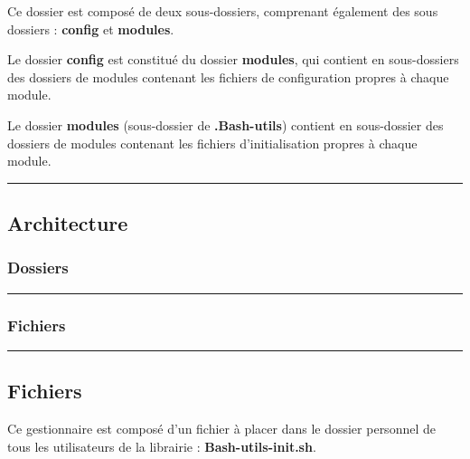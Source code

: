 \documentclass[a4paper,10pt]{article}
\begin{document}
  Ce dossier est composé de deux sous-dossiers, comprenant également des sous dossiers : \textbf{\color{lime}config\color{white}} et \textbf{\color{lime}modules\color{white}}.\linebreak

  Le dossier \textbf{\color{lime}config\color{white}} est constitué du dossier \textbf{\color{lime}modules\color{white}}, qui contient en sous-dossiers des dossiers de modules contenant les fichiers de configuration propres à chaque module.\linebreak

  Le dossier \textbf{\color{lime}modules\color{white}} (sous-dossier de \textbf{\color{lime}.Bash-utils\color{white}}) contient en sous-dossier des dossiers de modules contenant les fichiers d'initialisation propres à chaque module.\\[1\baselineskip]



  \color{green}\par\noindent\rule{\textwidth}{0.4pt}\color{white}

  \color{green}
  \subsection{Architecture}\color{white}

  \color{blue}
  \subsubsection{Dossiers}\color{white}



  \color{blue}\par\noindent\rule{\textwidth}{0.4pt}\color{white}
  
  \color{blue}
  \subsubsection{Fichiers}\color{white}



  \color{green}\par\noindent\rule{\textwidth}{0.4pt}\color{white}

  \color{green}
  \subsection{Fichiers}\color{white}
  Ce gestionnaire est composé d'un fichier à placer dans le dossier personnel de tous les utilisateurs de la librairie :  \textbf{\color{lime}Bash-utils-init.sh\color{white}}.\linebreak
\end{document}
